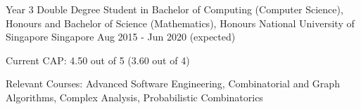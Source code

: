 

\begin{cventries}

  \cventry
  {Year 3 Double Degree Student in Bachelor of Computing (Computer Science), Honours and Bachelor of Science (Mathematics), Honours} %
  {National University of Singapore} %
  {Singapore} %
  {Aug 2015 - Jun 2020 (expected)} %
  {
    \begin{cvitems} %
    \item {Current CAP: 4.50 out of 5 (3.60 out of 4)}
    \item {Relevant Courses: Advanced Software Engineering, Combinatorial and Graph Algorithms, Complex Analysis, Probabilistic Combinatorics}
    \end{cvitems}
  }

\end{cventries}
